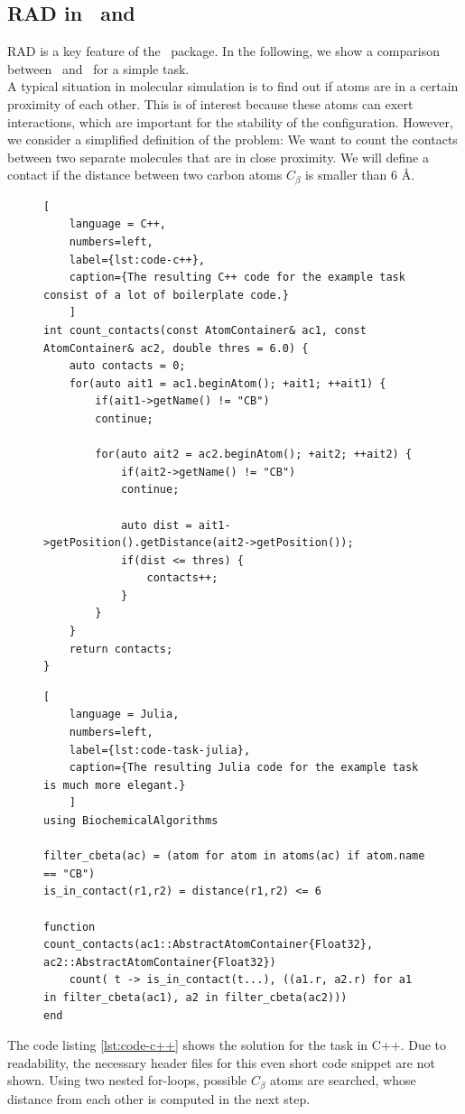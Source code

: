 \subsection{RAD in \ball\ and \biochem}

RAD is a key feature of the \biochem\ package. In the following, we show a comparison between \ball\ and \biochem\ for a simple task. \\
A typical situation in molecular simulation is to find out if atoms are in a certain proximity of each other. This is of interest because these atoms can exert interactions, which are important for the stability of the configuration. 
However, we consider a simplified definition of the problem: We want to count the contacts between two separate molecules that are in close proximity. We will define a contact if the distance between two carbon atoms $C_\beta$ is smaller than $6$ \AA. \\



\begin{figure}
\begin{lstlisting}[
	language = C++, 
	numbers=left, 
	label={lst:code-c++}, 
	caption={The resulting C++ code for the example task consist of a lot of boilerplate code.}
	]
int count_contacts(const AtomContainer& ac1, const AtomContainer& ac2, double thres = 6.0) {
	auto contacts = 0;
	for(auto ait1 = ac1.beginAtom(); +ait1; ++ait1) {
		if(ait1->getName() != "CB")
		continue;
		
		for(auto ait2 = ac2.beginAtom(); +ait2; ++ait2) {
			if(ait2->getName() != "CB")
			continue;
			
			auto dist = ait1->getPosition().getDistance(ait2->getPosition());
			if(dist <= thres) {
				contacts++;
			}
		}
	}
	return contacts;
}
\end{lstlisting}
\end{figure}


\begin{figure}
\begin{lstlisting}[
	language = Julia, 
	numbers=left, 
	label={lst:code-task-julia}, 
	caption={The resulting Julia code for the example task is much more elegant.}
	]
using BiochemicalAlgorithms 

filter_cbeta(ac) = (atom for atom in atoms(ac) if atom.name == "CB")
is_in_contact(r1,r2) = distance(r1,r2) <= 6	

function count_contacts(ac1::AbstractAtomContainer{Float32}, ac2::AbstractAtomContainer{Float32})
	count( t -> is_in_contact(t...), ((a1.r, a2.r) for a1 in filter_cbeta(ac1), a2 in filter_cbeta(ac2)))
end
\end{lstlisting}
\end{figure}
The code listing \ref{lst:code-c++} shows the solution for the task in C++. Due to readability, the necessary header files for this even short code snippet are not shown. Using two nested for-loops, possible $C_\beta$ atoms are searched, whose distance from each other is computed in the next step. \\

